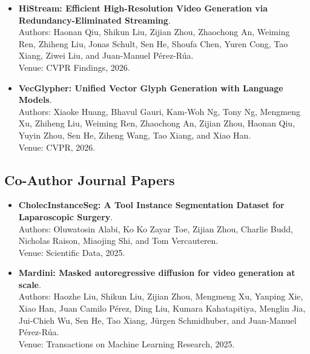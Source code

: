 \begin{itemize}
    Authors: Zhiheng Liu, Weiming Ren, Haozhe Liu, Zijian Zhou, Shoufa Chen, Haonan Qiu, Xiaoke Huang, Zhaochong An, Fanny Yang, Aditya Patel, Viktar Atliha, Tony Ng, Xiao Han, Chuyan Zhu, Chenyang Zhang, Ding Liu, Juan-Manuel Pérez-Rúa, Sen He, Jürgen Schmidhuber, Wenhu Chen, Ping Luo, Wei Liu, Tao Xiang, Jonas Schult, and Yuren Cong.\\
    Venue: CVPR, 2026.~\citep{liu2025tuna}
    \item \textbf{HiStream: Efficient High-Resolution Video Generation via Redundancy-Eliminated Streaming}.\\
    Authors: Haonan Qiu, Shikun Liu, Zijian Zhou, Zhaochong An, Weiming Ren, Zhiheng Liu, Jonas Schult, Sen He, Shoufa Chen, Yuren Cong, Tao Xiang, Ziwei Liu, and Juan-Manuel Pérez-Rúa.\\
    Venue: CVPR Findings, 2026.~\citep{qiu2025histream}
    \item \textbf{VecGlypher: Unified Vector Glyph Generation with Language Models}.\\
    Authors: Xiaoke Huang, Bhavul Gauri, Kam-Woh Ng, Tony Ng, Mengmeng Xu, Zhiheng Liu, Weiming Ren, Zhaochong An, Zijian Zhou, Haonan Qiu, Yuyin Zhou, Sen He, Ziheng Wang, Tao Xiang, and Xiao Han.\\
    Venue: CVPR, 2026.~\citep{huang2026vecglypher}
\end{itemize}

\subsection{Co-Author Journal Papers}
\begin{itemize}
    \item \textbf{CholecInstanceSeg: A Tool Instance Segmentation Dataset for Laparoscopic Surgery}.\\
    Authors: Oluwatosin Alabi, Ko Ko Zayar Toe, Zijian Zhou, Charlie Budd, Nicholas Raison, Miaojing Shi, and Tom Vercauteren.\\
    Venue: Scientific Data, 2025.~\citep{alabi2025cholecinstanceseg}
    \item \textbf{Mardini: Masked autoregressive diffusion for video generation at scale}.\\
    Authors: Haozhe Liu, Shikun Liu, Zijian Zhou, Mengmeng Xu, Yanping Xie, Xiao Han, Juan Camilo Pérez, Ding Liu, Kumara Kahatapitiya, Menglin Jia, Jui-Chieh Wu, Sen He, Tao Xiang, Jürgen Schmidhuber, and Juan-Manuel Pérez-Rúa.\\
    Venue: Transactions on Machine Learning Research, 2025.~\citep{liu2024mardini}
\end{itemize}

